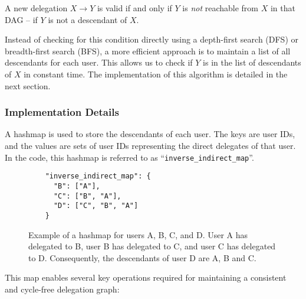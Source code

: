 A new delegation $X\to Y$ is valid if and only if $Y$ is \emph{not} reachable from $X$ in that DAG -- if $Y$ is not a descendant of $X$.

Instead of checking for this condition directly using a depth-first search (DFS) or breadth-first search (BFS), a more efficient approach is to maintain a list of all descendants for each user. This allows us to check if $Y$ is in the list of descendants of $X$ in constant time. The implementation of this algorithm is detailed in the next section.

\subsubsection{Implementation Details}
A hashmap is used to store the descendants of each user. The keys are user IDs, and the values are sets of user IDs representing the direct delegates of that user. In the code, this hashmap is referred to as ``\verb|inverse_indirect_map|''.
\begin{figure}[H]
  \centering
  \begin{verbatim}
    "inverse_indirect_map": {
      "B": ["A"],
      "C": ["B", "A"],
      "D": ["C", "B", "A"]
    }
  \end{verbatim}
  \caption{Example of a hashmap for users A, B, C, and D. User A has delegated to B, user B has delegated to C, and user C has delegated to D. Consequently, the descendants of user D are A, B and C.}
  \label{fig:inverse_indirect_map}
\end{figure}

This map enables several key operations required for maintaining a consistent and cycle-free delegation graph:

